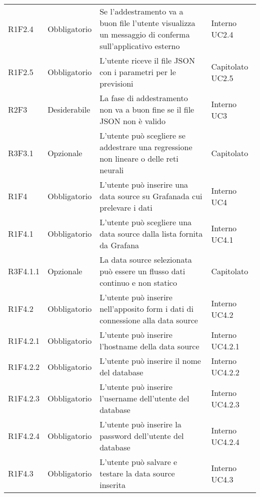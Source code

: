 \begin{longtable} {
		>{\centering}p{18mm} 
		>{\centering}p{28mm}
		>{}p{50mm} 
		>{}p{28mm}
	}
		R1F2.4 & Obbligatorio & Se l'addestramento va a buon file l'utente visualizza un messaggio di conferma sull'applicativo esterno & Interno UC2.4 \TBstrut \\ [2mm]

		R1F2.5 & Obbligatorio & L'utente riceve il file JSON con i parametri per le previsioni & Capitolato UC2.5 \TBstrut \\ [2mm]

		R2F3 & Desiderabile & La fase di addestramento non va a buon fine se il file JSON non è valido & Interno UC3 \TBstrut \\ [2mm]

		R3F3.1 & Opzionale & L'utente può scegliere se addestrare una regressione non lineare o delle reti neurali\glo & Capitolato \TBstrut \\ [2mm]

		R1F4 & Obbligatorio & L'utente può inserire una data source su Grafana\glosp da cui prelevare i dati & Interno UC4 \TBstrut \\ [2mm]

		R1F4.1 & Obbligatorio & L'utente può scegliere una data source dalla lista fornita da Grafana\glo & Interno UC4.1 \TBstrut \\ [2mm]

		R3F4.1.1 & Opzionale & La data source selezionata può essere un flusso dati continuo e non statico & Capitolato \TBstrut \\ [2mm]

        R1F4.2 & Obbligatorio & L'utente può inserire nell'apposito form i dati di connessione alla data source & Interno UC4.2 \TBstrut \\ [2mm]

		R1F4.2.1 & Obbligatorio & L'utente può inserire l'hostname della data source & Interno UC4.2.1 \TBstrut \\ [2mm]

		R1F4.2.2 & Obbligatorio & L'utente può inserire il nome del database & Interno UC4.2.2 \TBstrut \\ [2mm]

        R1F4.2.3 & Obbligatorio & L'utente può inserire l'username dell'utente del database & Interno UC4.2.3 \TBstrut \\ [2mm]

        R1F4.2.4 & Obbligatorio & L'utente può inserire la password dell'utente del database & Interno UC4.2.4 \TBstrut \\ [2mm]

		R1F4.3 & Obbligatorio & L'utente può salvare e testare la data source inserita & Interno UC4.3 \TBstrut \\ [2mm]


\end{longtable}
